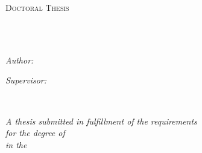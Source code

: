 \documentclass[
  letterpaper,
  11pt,
  english,
  singlespacing,
  headsepline]{MastersDoctoralThesis}
\author{佐々木
毅然} %
\begin{document}
\frontmatter %

\pagestyle{plain} %


\begin{titlepage}
\begin{center}

\vspace*{.06\textheight}
{\scshape\LARGE \univname\par}\vspace{1.5cm} %
\textsc{\Large Doctoral Thesis}\\[0.5cm] %

\HRule \\[0.4cm] %
{\huge \bfseries \ttitle\par}\vspace{0.4cm} %
\HRule \\[1.5cm] %
 
\begin{minipage}[t]{0.4\textwidth}
\begin{flushleft} \large
\emph{Author:}\\
\authorname
\end{flushleft}
\end{minipage}
\begin{minipage}[t]{0.4\textwidth}
\begin{flushright} \large
\emph{Supervisor:} \\
%
\href{https://quarto.org/}{\supname} %

\end{flushright}
\end{minipage}\\[3cm]
 
\vfill

\large \textit{A thesis submitted in fulfillment of the requirements\\ for the degree of \degreename}\\[0.3cm] %
\textit{in the}\\[0.4cm]
\groupname\\
\deptname\\[2cm] %
 

\end{center}
\end{titlepage}
\end{document}
